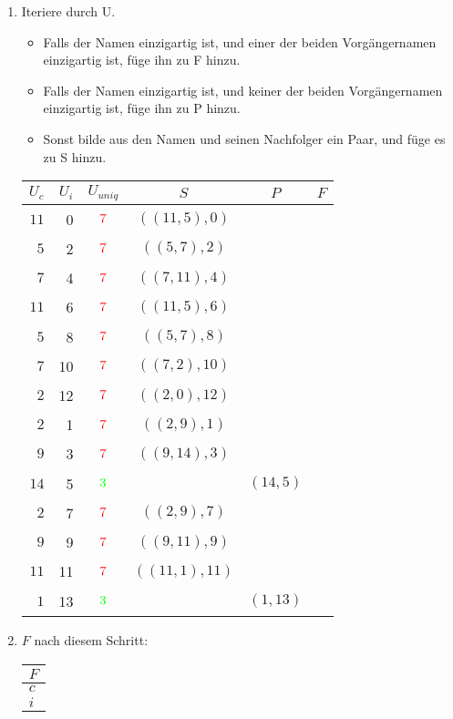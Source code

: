 \begin{enumerate}
\item 
Iteriere durch U.
\begin{itemize}
\item Falls der Namen einzigartig ist, und einer der beiden Vorgängernamen einzigartig ist, füge ihn zu F hinzu.
\item Falls der Namen einzigartig ist, und keiner der beiden Vorgängernamen einzigartig ist, füge ihn zu P hinzu.
\item Sonst bilde aus den Namen und seinen Nachfolger ein Paar, und füge es zu S hinzu.
\end{itemize}

\begin{center}
\small\begin{tabular}{rrcccc}
\toprule 
 $U_c$ & $U_i$ & $U_{uniq}$ &     $S$      &   $P$   &   $F$   \\
\midrule 
$11$ & 0 & $$\xmarkc$$ & $((11, 5), 0)$ &       &       \\
$ 5$ & 2 & $$\xmarkc$$ & $(( 5, 7), 2)$ &       &       \\
$ 7$ & 4 & $$\xmarkc$$ & $(( 7,11), 4)$ &       &       \\
$11$ & 6 & $$\xmarkc$$ & $((11, 5), 6)$ &       &       \\
$ 5$ & 8 & $$\xmarkc$$ & $(( 5, 7), 8)$ &       &       \\
$ 7$ & 10 & $$\xmarkc$$ & $(( 7, 2),10)$ &       &       \\
$ 2$ & 12 & $$\xmarkc$$ & $(( 2, 0),12)$ &       &       \\
$ 2$ & 1 & $$\xmarkc$$ & $(( 2, 9), 1)$ &       &       \\
$ 9$ & 3 & $$\xmarkc$$ & $(( 9,14), 3)$ &       &       \\
$14$ & 5 & $$\cmarkc$$  &            & $(14, 5)$ &       \\
$ 2$ & 7 & $$\xmarkc$$ & $(( 2, 9), 7)$ &       &       \\
$ 9$ & 9 & $$\xmarkc$$ & $(( 9,11), 9)$ &       &       \\
$11$ & 11 & $$\xmarkc$$ & $((11, 1),11)$ &       &       \\
$ 1$ & 13 & $$\cmarkc$$  &            & $( 1,13)$ &       \\
\bottomrule 
\end{tabular}
\end{center}
\item 
$F$ nach diesem Schritt:
\begin{center}
\small\begin{tabular}{l}
    \toprule 
    $F$\\
    \midrule 
    $c$ \\
    $i$ \\
    \bottomrule 
\end{tabular}
\end{center}


\end{enumerate}
